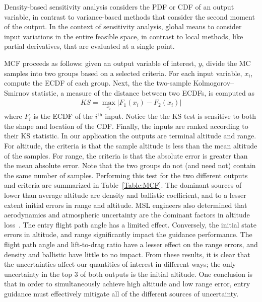 Density-based sensitivity analysis considers the PDF or CDF of an output variable, in contrast to variance-based methods that consider the second moment of the output. 
In the context of sensitivity analysis, global means to consider input variations in the entire feasible space, in contrast to local methods, like partial derivatives, that are evaluated at a single point. 

MCF proceeds as follows: given an output variable of interest, $y$, divide the MC samples into two groups based on a selected criteria. For each input variable, $x_i$, compute the ECDF of each group. Next, the the two-sample Kolmogorov–Smirnov statistic, a measure of the distance between two ECDFs, is computed as
 \begin{align}
	KS = \max_{x_i} | F_1(x_i) - F_2(x_i) | \label{Eq:KSTest}
\end{align}
where $F_i$ is the ECDF of the $i^{\mathrm{th}}$ input. Notice the the KS test is sensitive to both the shape and location of the CDF. Finally, the inputs are ranked according to their KS statistic. In our application the outputs are terminal altitude and range. For altitude, the criteria is that the sample altitude is less than the mean altitude of the samples. For range, the criteria is that the absolute error is greater than the mean absolute error. Note that the two groups do not (and need not) contain the same number of samples. Performing this test for the two different outputs and criteria are summarized in Table~\ref{Table:MCF}. The dominant sources of lower than average altitude are density and ballistic coefficient, and to a lesser extent initial errors in range and altitude. MSL engineers also determined that aerodynamics and atmospheric uncertainty are the dominant factors in altitude loss~\cite{MSL_EDL2}. The entry flight path angle has a limited effect. Conversely, the initial state errors in altitude, and range significantly impact the guidance performance. The flight path angle and lift-to-drag ratio have a lesser effect on the range errors, and density and ballistic have little to no impact. From these results, it is clear that the uncertainties affect our quantities of interest in different ways; the only uncertainty in the top 3 of both outputs is the initial altitude. One conclusion is that in order to simultaneously achieve high altitude and low range error, entry guidance must effectively mitigate all of the different sources of uncertainty. 
